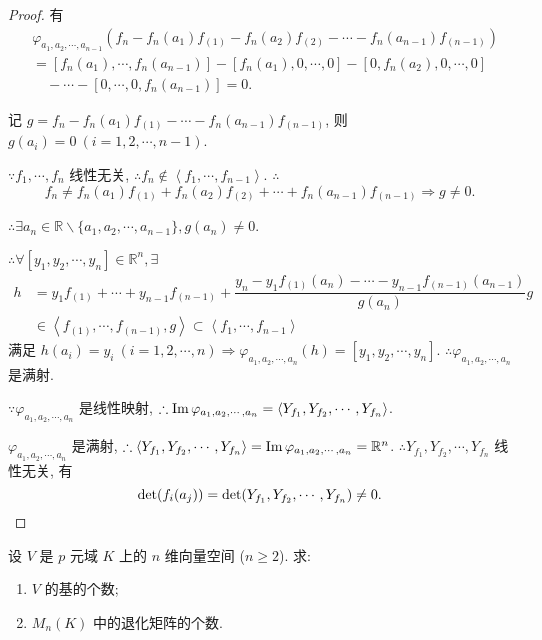 \documentclass[color=black,device=normal,lang=cn,mode=geye]{elegantnote}
\begin{document}
\begin{proof}
    有
    \begin{align*}
        & \varphi_{a_1,a_2,\cdots,a_{n-1}}(f_n-f_n(a_1)f_{(1)}-f_n(a_2)f_{(2)}-\cdots-f_n(a_{n-1})f_{(n-1)}) \\
        & =[f_n(a_1),\cdots,f_n(a_{n-1})]-[f_n(a_1),0,\cdots,0]-[0,f_n(a_2),0,\cdots,0] \\
        & \quad-\cdots-[0,\cdots,0,f_n(a_{n-1})]=0.
    \end{align*}

    记 $g=f_n-f_n(a_1)f_{(1)}-\cdots-f_n(a_{n-1})f_{(n-1)}$, 则 $g(a_i)=0\ (i=1,2,\cdots,n-1)$.
    
    $\because f_1,\cdots,f_n$ 线性无关, $\therefore f_n\notin\left<f_1,\cdots,f_{n-1}\right>$. $\therefore$
    \[f_n\neq f_n(a_1)f_{(1)}+f_n(a_2)f_{(2)}+\cdots+f_n(a_{n-1})f_{(n-1)}\Rightarrow g\neq0.\]

    $\therefore\exists a_n\in\mathbb{R}\backslash\{a_1,a_2,\cdots,a_{n-1}\},g(a_n)\neq0$.

    $\therefore\forall[y_1,y_2,\cdots,y_n]\in\mathbb{R}^n,\exists$
    \begin{align*}
        h & =y_1f_{(1)}+\cdots+y_{n-1}f_{(n-1)}+\dfrac{y_n-y_1f_{(1)}(a_n)-\cdots-y_{n-1}f_{(n-1)}(a_{n-1})}{g(a_n)}g \\
        & \in\left<f_{(1)},\cdots,f_{(n-1)},g\right>\subset\left<f_1,\cdots,f_{n-1}\right>
    \end{align*}
    满足 $h(a_i)=y_i\ (i=1,2,\cdots,n)\Rightarrow\varphi_{a_1,a_2,\cdots,a_n}(h)=[y_1,y_2,\cdots,y_n]$. $\therefore\varphi_{a_1,a_2,\cdots,a_n}$ 是满射.

    $\because\varphi_{a_1,a_2,\cdots,a_n}$ 是线性映射, $\therefore\operatorname{Im}\varphi_{a_1,a_2,\cdots,a_n}=\left<Y_{f_1},Y_{f_2},\cdots,Y_{f_n}\right>$.
    
    $\varphi_{a_1,a_2,\cdots,a_n}$ 是满射, $\therefore\left<Y_{f_1},Y_{f_2},\cdots,Y_{f_n}\right>=\operatorname{Im}\varphi_{a_1,a_2,\cdots,a_n}=\mathbb{R}^n$. $\therefore Y_{f_1},Y_{f_2},\cdots,Y_{f_n}$ 线性无关, 有
    \[\det(f_i(a_j))=\det(Y_{f_1},Y_{f_2},\cdots,Y_{f_n})\neq0.\qedhere\]
\end{proof}
\begin{exercisec}[1.3.2]
    设 $V$ 是 $p$ 元域 $K$ 上的 $n$ 维向量空间 ($n\geq2$). 求:
    \begin{enumerate}
        \def\labelenumi{(\arabic{enumi})}
        \item $V$ 的基的个数;
        \item $M_n(K)$ 中的退化矩阵的个数.
    \end{enumerate}
\end{exercisec}
\end{document}
